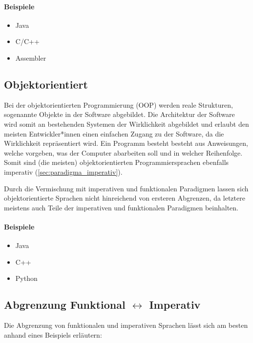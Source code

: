 		\paragraph{Beispiele}
			\begin{itemize}
				\item Java
				\item C/C++
				\item Assembler
			\end{itemize}
	
	\subsection{Objektorientiert}
		\label{sec:paradigma_oop}
		
		Bei der objektorientierten Programmierung (OOP) werden reale Strukturen, sogenannte Objekte in der Software abgebildet. Die Architektur der Software wird somit an bestehenden Systemen der Wirklichkeit abgebildet und erlaubt den meisten Entwickler*innen einen einfachen Zugang zu der Software, da die Wirklichkeit repräsentiert wird. Ein Programm besteht besteht aus Anweisungen, welche vorgeben, was der Computer abarbeiten soll und in welcher Reihenfolge. Somit sind (die meisten) objektorientierten Programmiersprachen ebenfalls imperativ (\ref{sec:paradigma_imperativ}).
		
		Durch die Vermischung mit imperativen und funktionalen Paradigmen lassen sich objektorientierte Sprachen nicht hinreichend von ersteren Abgrenzen, da letztere meistens auch Teile der imperativen und funktionalen Paradigmen beinhalten.
		
		\paragraph{Beispiele}
			\begin{itemize}
				\item Java
				\item C++
				\item Python
			\end{itemize}
	
	\subsection{Abgrenzung Funktional $ \leftrightarrow $ Imperativ}
		\label{sec:paradigma_abgrenzung_funktional_imperativ}
		
		Die Abgrenzung von funktionalen und imperativen Sprachen lässt sich am besten anhand eines Beispiels erläutern:
		
